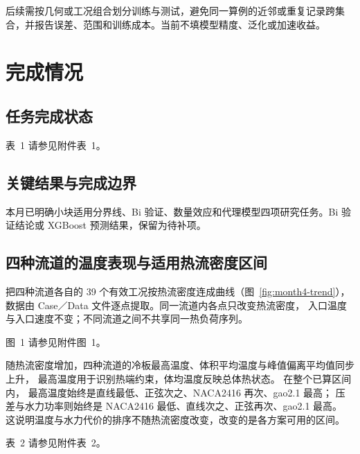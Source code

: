 \documentclass[stage2,fontset=fandol]{ydzjreport}
\makeatletter
\newcommand{\submissionnumber}[1]{\def\@currentlabel{#1}}
\makeatother
\begin{document}
后续需按几何或工况组合划分训练与测试，避免同一算例的近邻或重复记录跨集合，并报告误差、范围和训练成本。当前不填模型精度、泛化或加速收益。

\section{完成情况}

\subsection{任务完成状态}


\par\noindent \begingroup\submissionnumber{1}\label{tab:tasks}\endgroup 表~1 请参见附件表~1。\par


\subsection{关键结果与完成边界}

本月已明确小块适用分界线、Bi 验证、数量效应和代理模型四项研究任务。Bi 验证结论或 XGBoost 预测结果，保留为待补项。

\subsection{四种流道的温度表现与适用热流密度区间}

把四种流道各自的 39 个有效工况按热流密度连成曲线（图~\ref{fig:month4-trend}），
数据由 Case／Data 文件逐点提取。同一流道内各点只改变热流密度，
入口温度与入口速度不变；不同流道之间不共享同一热负荷序列。


\par\noindent \begingroup\submissionnumber{1}\label{fig:month4-trend}\endgroup 图~1 请参见附件图~1。\par


随热流密度增加，四种流道的冷板最高温度、体积平均温度与峰值偏离平均值同步上升，
最高温度用于识别热端约束，体均温度反映总体热状态。
在整个已算区间内，
最高温度始终是直线最低、正弦次之、NACA2416 再次、gao2.1 最高；
压差与水力功率则始终是 NACA2416 最低、直线次之、正弦再次、gao2.1 最高。
这说明温度与水力代价的排序不随热流密度改变，改变的是各方案可用的区间。

\par



\par\noindent \begingroup\submissionnumber{2}\label{tab:month4-conditions}\endgroup 表~2 请参见附件表~2。\par
\end{document}
